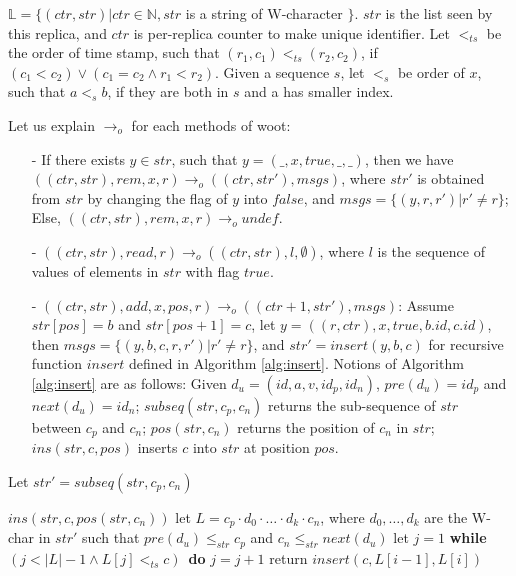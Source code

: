 $\mathbb{L} = \{ (ctr, str) \vert ctr \in \mathbb{N}, str$ is a string of W-character $\}$. $str$ is the list seen by this replica, and $ctr$ is per-replica counter to make unique identifier. Let $<_{\mathit{ts}}$ be the order of time stamp, such that $(r_1,c_1) <_{\mathit{ts}} (r_2,c_2)$, if $(c_1 < c_2) \vee (c_1 = c_2 \wedge r_1 < r_2)$. Given a sequence $s$, let $<_s$ be order of $x$, such that $a <_s b$, if they are both in $s$ and a has smaller index.

Let us explain $\rightarrow_o$ for each methods of woot:

\begin{itemize}
\setlength{\itemsep}{0.5pt}
\item[-]  If there exists $y \in str$, such that $y = (\_,x,\mathit{true},\_,\_)$, then we have $((ctr,str),rem,x,r) \rightarrow_o ((ctr,str'),msgs)$, where $str'$ is obtained from $str$ by changing the flag of $y$ into $\mathit{false}$, and $msgs = \{ (y,r,r') \vert r' \neq r \}$; Else, $((ctr,str),rem,x,r) \rightarrow_o \mathit{undef}$.

\item[-] $((ctr,str),read,r) \rightarrow_o ((ctr,str),l,\emptyset)$, where $l$ is the sequence of values of elements in $str$ with flag $\mathit{true}$.

\item[-] $((ctr,str),add,x,pos,r) \rightarrow_o ((ctr+1,str'),msgs)$: Assume $str[pos]=b$ and $str[pos+1]=c$, let $y = ((r,ctr),x,\mathit{true},b.id,c.id)$, then $msgs = \{ (y,b,c,r,r') \vert r' \neq r \}$, and $str' = \mathit{insert}(y,b,c)$ for recursive function $\mathit{insert}$ defined in Algorithm \ref{alg:insert}. Notions of Algorithm \ref{alg:insert} are as follows: Given $d_u = (id,a,v,id_p,id_n)$, $pre(d_u) = id_p$ and $next(d_u)=id_n$; $subseq(str,c_p,c_n)$ returns the sub-sequence of $str$ between $c_p$ and $c_n$; $pos(str,c_n)$ returns the position of $c_n$ in $str$; $ins(str,c,pos)$ inserts $c$ into $str$ at position $pos$.
\end{itemize}


\begin{algorithm}[t]

Let $str' = subseq(str,c_p,c_n)$ \;

{
    \Return $ins(str,c,pos(str,c_n))$\;
}
\Else
{
    let $L = c_p \cdot d_0 \cdot \ldots \cdot d_k \cdot c_n$, where $d_0,\ldots,d_k$ are the W-char in $str'$ such that $pre(d_u) \leq_{str} c_p$ and $c_n \leq_{str} next(d_u)$\;
    let $j = 1$\;
    {\bf while} $(j < \vert L \vert -1 \wedge L[j] <_{\mathit{ts}} c)$\ {\bf do}
    {
        $j = j+1$\;
    }
    return $\mathit{insert}(c,L[i-1],L[i])$\;
}
\caption{$\mathit{insert}$}
\label{alg:insert}
\end{algorithm}

